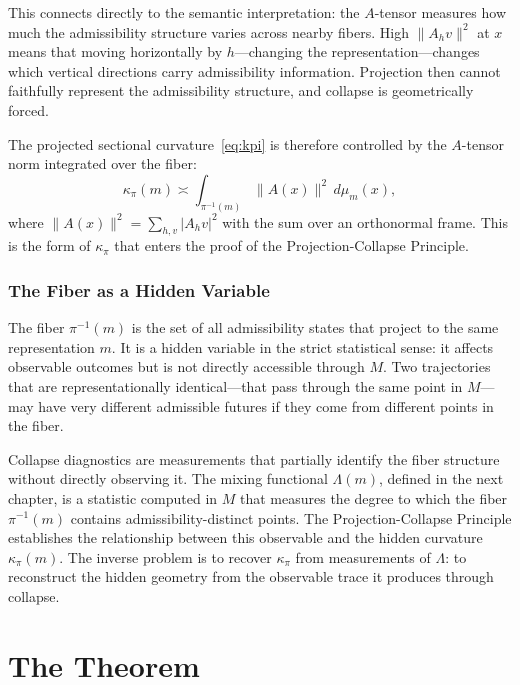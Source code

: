 \documentclass[12pt, oneside]{book}
\theoremstyle{plain-flyxion}
\theoremstyle{definition-flyxion}
\newcommand{\kpi}{\kappa_{\pi}}
\newcommand{\Lam}{\Lambda}
\begin{document}
This connects directly to the semantic interpretation: the $A$-tensor measures how much
the admissibility structure varies across nearby fibers. High $\|A_h v\|^2$ at $x$ means
that moving horizontally by $h$---changing the representation---changes which vertical
directions carry admissibility information. Projection then cannot faithfully represent
the admissibility structure, and collapse is geometrically forced.

The projected sectional curvature~\eqref{eq:kpi} is therefore controlled by the
$A$-tensor norm integrated over the fiber:
\begin{equation}\label{eq:kpi-A}
\kpi(m) \asymp \int_{\pi^{-1}(m)} \|A(x)\|^2\, d\mu_m(x),
\end{equation}
where $\|A(x)\|^2 = \sum_{h,v} |A_h v|^2$ with the sum over an orthonormal frame. This
is the form of $\kpi$ that enters the proof of the Projection-Collapse Principle.

\section{The Fiber as a Hidden Variable}

The fiber $\pi^{-1}(m)$ is the set of all admissibility states that project to the same
representation $m$. It is a hidden variable in the strict statistical sense: it affects
observable outcomes but is not directly accessible through $M$. Two trajectories that are
representationally identical---that pass through the same point in $M$---may have very
different admissible futures if they come from different points in the fiber.

Collapse diagnostics are measurements that partially identify the fiber structure without
directly observing it. The mixing functional $\Lam(m)$, defined in the next chapter, is a
statistic computed in $M$ that measures the degree to which the fiber $\pi^{-1}(m)$
contains admissibility-distinct points. The Projection-Collapse Principle establishes the
relationship between this observable and the hidden curvature $\kpi(m)$. The inverse
problem is to recover $\kpi$ from measurements of $\Lam$: to reconstruct the hidden
geometry from the observable trace it produces through collapse.

\part{The Theorem}
\end{document}
